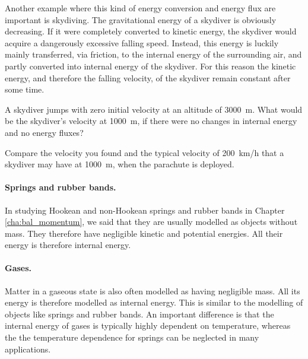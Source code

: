 \documentclass[a4paper,12pt,%
onecolumn,oneside,%
british%
]{memoir}
\renewcommand*{\|}[1][]{\nonscript\:#1\vert\nonscript\:\mathopen{}}
\newcommand*{\chap}{Chapter}%
\begin{document}
Another example where this kind of energy conversion and energy flux are important is skydiving. The gravitational energy of a skydiver is obviously decreasing. If it were completely converted to kinetic energy, the skydiver would acquire a dangerously excessive falling speed. Instead, this energy is luckily mainly transferred, via friction, to the internal energy of the surrounding air, and partly converted into internal energy of the skydiver. For this reason the kinetic energy, and therefore the falling velocity, of the skydiver remain constant after some time.
%
%

\begin{exercise}
  A skydiver jumps with zero initial velocity at an altitude of \qty{3000}{m}. What would be the skydiver's velocity at \qty{1000}{m}, if there were no changes in internal energy and no energy fluxes?

  Compare the velocity you found and the typical velocity of \qty{200}{km/h} that a skydiver may have at \qty{1000}{m}, when the parachute is deployed.
\end{exercise}

\paragraph{Springs and rubber bands.}

In studying Hookean and non-Hookean springs and rubber bands in \chap\,\ref{cha:bal_momentum}, we said that they are usually modelled as objects without mass. They therefore have negligible kinetic and potential energies. All their energy is therefore internal energy.

\paragraph{Gases.}
Matter in a gaseous state is also often modelled as having negligible mass. All its energy is therefore modelled as internal energy. This is similar to the modelling of objects like springs and rubber bands. An important difference is that the internal energy of gases is typically highly dependent on temperature, whereas the the temperature dependence for springs can be neglected in many applications.
\end{document}
